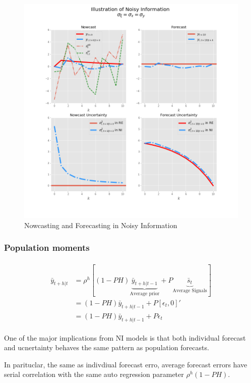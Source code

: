 \documentclass[]{article}
\begin{document}
\begin{figure}[ht]
	\centering
	\includegraphics[width=13cm]{figures/ni_illustration.png}  
	\caption{Nowcasting and Forecasting in Noisy Information}
	\label{IllustrateNI}
\end{figure}


\subsubsection{Population moments}

\begin{eqnarray}
\begin{aligned}
\bar y_{t+h|t} & = \rho^h [(1-PH) \underbrace{\bar  y_{t+h|t-1}}_{\text{Average prior}} + P \underbrace{\bar s_{t}}_{\text{Average Signals}}] \\
& = (1-PH) \bar y_{t+h|t-1}+ P [\epsilon_t, 0]' \\
& = (1-PH) \bar y_{t+h|t-1} + P \epsilon_t
\end{aligned}
\end{eqnarray}

One of the major implications from NI models is that both individual forecast and ucnertainty behaves the same pattern as population forecasts. 

In parituclar, the same as indivdiual forecast erro, average forecast errors have serial correlation with the same auto regression parameter $\rho^h(1-PH)$. 
\end{document}
